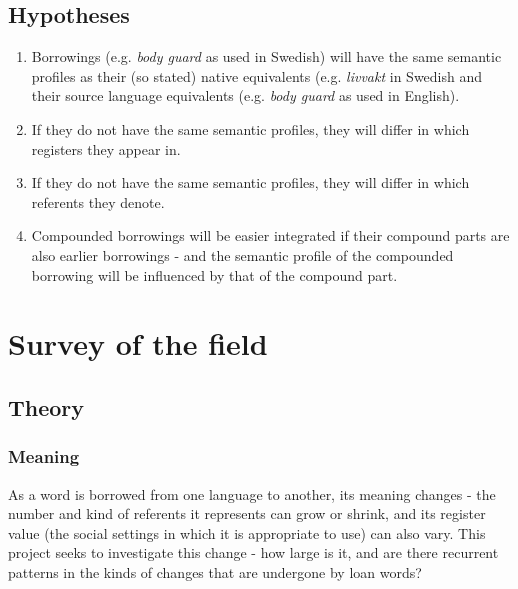 \documentclass[a4paper]{article}
\begin{document}
\subsection{Hypotheses}
\begin{enumerate}
	\item Borrowings (e.g. \emph{body guard} as used in Swedish) will have the same semantic profiles as their (so stated) native equivalents (e.g. \emph{livvakt} in Swedish and their source language equivalents (e.g. \emph{body guard} as used in English).
	\item If they do not have the same semantic profiles, they will differ in which registers they appear in.
	\item If they do not have the same semantic profiles, they will differ in which referents they denote.
	\item Compounded borrowings will be easier integrated if their compound parts are also earlier borrowings - and the semantic profile of the compounded borrowing will be influenced by that of the compound part.
	
\end{enumerate}



\section{Survey of the field}


\subsection{Theory}


\subsubsection{Meaning}
\label{sect_meaning}

As a word is borrowed from one language to another, its meaning changes - the number and kind of referents it represents can grow or shrink, and its register value (the social settings in which it is appropriate to use) can also vary. This project seeks to investigate this change - how large is it, and are there recurrent patterns in the kinds of changes that are undergone by loan words?
\end{document}
